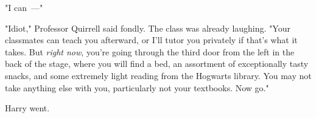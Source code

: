"I can~---"

"Idiot," Professor Quirrell said fondly. The class was already laughing. "Your
classmates can teach you afterward, or I'll tutor you privately if that's what
it takes. But \emph{right now}, you're going through the third door from the
left in the back of the stage, where you will find a bed, an assortment of
exceptionally tasty snacks, and some extremely light reading from the Hogwarts
library. You may not take anything else with you, particularly not your
textbooks. Now go."

Harry went.
